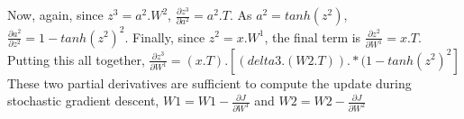 \documentclass[11pt]{article}
\begin{document}
\newline
Now, again, since $ z^{3} = a^{2}.W^{2}$,  $\frac{\partial z^{3}}{\partial a^{2}} = a^{2}.T$. 
\newline
As $ a^{2} =  tanh(z^{2}) $, $\frac{\partial a^{2}}{\partial z^{2}} = 1 - tanh(z^{2})^{2}$.
\newline
Finally, since 
$ z^{2} = x.W^{1} $, the final term is $\frac{\partial z^{2}}{\partial W^{1}} = x.T$.
\newline
Putting this all together, $\frac{\partial z^{3}}{\partial W^{1}} = (x.T) . [(delta3 . (W2.T)) .* (1 - tanh(z^{2})^{2}] $
\newline
These two partial derivatives are sufficient to compute the update during stochastic gradient descent, $ W1 = W1 - \frac{\partial J}{\partial W^{1}}$ and $ W2 = W2 - \frac{\partial J}{\partial W^{2}}$



\newpage
\end{document}
